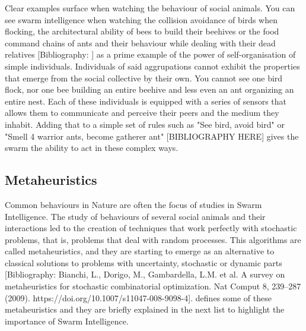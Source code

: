 Clear examples surface when watching the behaviour of social animals. You can see swarm intelligence when watching the collision avoidance of birds when flocking, the architectural ability of bees to build their beehives or the food command chains of ants and their behaviour while dealing with their dead relatives [Bibliography: ] as a prime example of the power of self-organisation of simple individuals. Individuals of said aggrupations cannot exhibit the properties that emerge from the social collective by their own. You cannot see one bird flock, nor one bee building an entire beehive and less even an ant organizing an entire nest. Each of these individuals is equipped with a series of sensors that allows them to communicate and perceive their peers and the medium they inhabit. Adding that to a simple set of rules such as "See bird, avoid bird" or "Smell 4 warrior ants, become gatherer ant" [BIBLIOGRAPHY HERE] gives the swarm the ability to act in these complex ways.

\subsection{Metaheuristics}
Common behaviours in Nature are often the focus of studies in Swarm Intelligence. The study of behaviours of several social animals and their interactions led to the creation of techniques that work perfectly with stochastic problems, that is, problems that deal with random processes. This algorithms are called metaheuristics, and they are starting to emerge as an alternative to classical solutions to problems with uncertainty, stochastic or dynamic parts [Bibliography: Bianchi, L., Dorigo, M., Gambardella, L.M. et al. A survey on metaheuristics for stochastic combinatorial optimization. Nat Comput 8, 239–287 (2009). https://doi.org/10.1007/s11047-008-9098-4]. \citep{B_Swarm_Optimization} defines some of these metaheuristics and they are briefly explained in the next list to highlight the importance of Swarm Intelligence.

